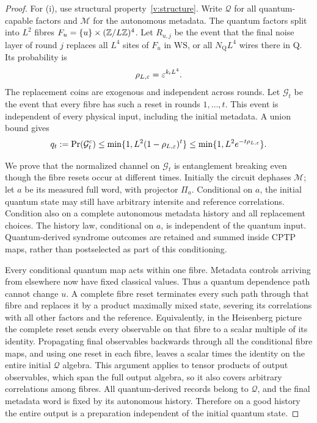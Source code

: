 \begin{proof}
For (i), use structural property~\ref{v:structure}. Write
\(\mathcal Q\) for all quantum-capable factors and \(\mathcal M\)
for the autonomous metadata. The quantum factors split into \(L^2\)
fibres \(F_u=\{u\}\times(\mathbb Z/L\mathbb Z)^4\). Let \(R_{u,j}\) be the event
that the final noise layer of round \(j\) replaces all \(L^4\) sites
of \(F_u\) in \(\mathrm{WS}\), or all \(N_{\mathrm Q}L^4\) wires there in Q. Its
probability is
\[
 \rho_{L,\varepsilon}=\varepsilon^{k_{\mathsf r}L^4}.
\]
The replacement coins are exogenous and independent across rounds.
Let \(\mathcal G_t\) be the event that every fibre has such a reset in rounds
\(1,\ldots,t\). This event is independent of every physical input,
including the initial metadata. A union bound gives
\begin{equation}\label{v:fibre-tail}
 q_t:=\Pr(\mathcal G_t^c)
 \le\min\{1,L^2(1-\rho_{L,\varepsilon})^t\}
 \le\min\{1,L^2e^{-t\rho_{L,\varepsilon}}\}.
\end{equation}

We prove that the normalized channel on \(\mathcal G_t\) is entanglement
breaking even though the fibre resets occur at different times.
Initially the circuit dephases \(\mathcal M\); let \(a\)
be its measured full word, with projector \(\Pi_a\). Conditional
on \(a\), the initial quantum state may still have arbitrary
intersite and reference correlations. Condition also on a complete
autonomous metadata history and all replacement choices. The history
law, conditional on \(a\), is independent of the quantum input.
Quantum-derived syndrome outcomes are retained and summed inside
CPTP maps, rather than postselected as part of this conditioning.

Every conditional quantum map acts within one fibre. Metadata
controls arriving from elsewhere now have fixed classical values.
Thus a quantum dependence path cannot change \(u\). A complete
fibre reset terminates every such path through that fibre and replaces
it by a product maximally mixed state, severing its correlations with
all other factors and the reference. Equivalently, in the Heisenberg
picture the complete reset sends every observable on that fibre to a
scalar multiple of its identity. Propagating final observables
backwards through all the conditional fibre maps, and using one reset
in each fibre, leaves a scalar times the identity on the entire
initial \(\mathcal Q\) algebra. This argument applies to tensor
products of output observables, which span the full output algebra,
so it also covers arbitrary correlations among fibres. All
quantum-derived records belong to \(\mathcal Q\), and the final
metadata word is fixed by its autonomous history. Therefore on a good
history the entire output is a preparation independent of the initial
quantum state.


\end{proof}
